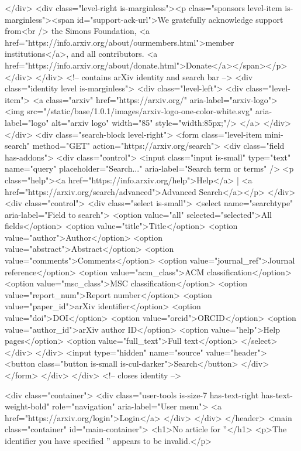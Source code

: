   </div>
  <div class="level-right is-marginless"><p class="sponsors level-item is-marginless"><span id="support-ack-url">We gratefully acknowledge support from<br /> the Simons Foundation, <a href="https://info.arxiv.org/about/ourmembers.html">member institutions</a>, and all contributors. <a href="https://info.arxiv.org/about/donate.html">Donate</a></span></p></div>
</div>
<!-- contains arXiv identity and search bar -->
<div class="identity level is-marginless">
  <div class="level-left">
    <div class="level-item">
      <a class="arxiv" href="https://arxiv.org/" aria-label="arxiv-logo">
        <img src="/static/base/1.0.1/images/arxiv-logo-one-color-white.svg" aria-label="logo" alt="arxiv logo" width="85" style="width:85px;"/>
      </a>
    </div>
  </div>
    <div class="search-block level-right">
    <form class="level-item mini-search" method="GET" action="https://arxiv.org/search">
      <div class="field has-addons">
        <div class="control">
          <input class="input is-small" type="text" name="query" placeholder="Search..." aria-label="Search term or terms" />
          <p class="help"><a href="https://info.arxiv.org/help">Help</a> | <a href="https://arxiv.org/search/advanced">Advanced Search</a></p>
        </div>
        <div class="control">
          <div class="select is-small">
            <select name="searchtype" aria-label="Field to search">
              <option value="all" selected="selected">All fields</option>
              <option value="title">Title</option>
              <option value="author">Author</option>
              <option value="abstract">Abstract</option>
              <option value="comments">Comments</option>
              <option value="journal_ref">Journal reference</option>
              <option value="acm_class">ACM classification</option>
              <option value="msc_class">MSC classification</option>
              <option value="report_num">Report number</option>
              <option value="paper_id">arXiv identifier</option>
              <option value="doi">DOI</option>
              <option value="orcid">ORCID</option>
              <option value="author_id">arXiv author ID</option>
              <option value="help">Help pages</option>
              <option value="full_text">Full text</option>
            </select>
          </div>
        </div>
        <input type="hidden" name="source" value="header">
        <button class="button is-small is-cul-darker">Search</button>
      </div>
    </form>
  </div>
</div> <!-- closes identity -->

<div class="container">
    <div class="user-tools is-size-7 has-text-right has-text-weight-bold" role="navigation" aria-label="User menu">
<a href="https://arxiv.org/login">Login</a>    </div>
</div>  </header>
  <main class="container" id="main-container">
<h1>No article for ''</h1>
<p>The identifier you have specified '' appears to be invalid.</p>

